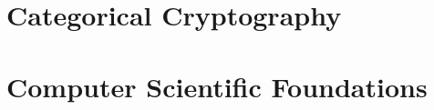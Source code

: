 \documentclass[12pt,twoside]{reedthesis}
\begin{document}
\chapter{Categorical Cryptography}
\label{chap:categorical-cryptography}


\appendix
\chapter{Computer Scientific Foundations}
\label{chap:cs-theory}


\backmatter{}
\nocite{*}
\printbibliography


\end{document}
